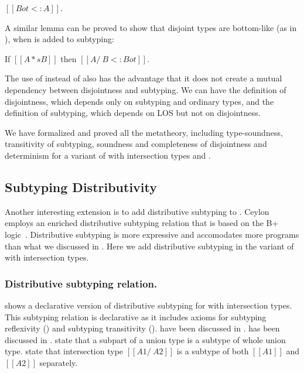 \begin{lemma}
  $[[Bot <: A]]$.
\label{lemma:discussion:bls}
\end{lemma}

\noindent A similar lemma can be proved to show that disjoint types are bottom-like
(as in ), when  is added to subtyping:

\begin{lemma}
  If $[[A *s B]]$ then $[[A /\ B <: Bot]]$.
\label{lemma:discussion:disjoint-types}
\end{lemma}

\noindent The use of  instead of  also has
the advantage that it does not create a mutual dependency between
disjointness and subtyping. We can have the definition of
disjointness, which depends only on subtyping and ordinary types, and
the definition of subtyping, which depends on LOS but not on
disjointness.

We have formalized and proved all the metatheory, including
type-soundness, transitivity of subtyping, soundness and completeness
of disjointness and determinism for a variant of \name with
intersection types and .

\subsection{Subtyping Distributivity}
\label{sec:inter:dist}

Another interesting extension is to add distributive subtyping to \cal.
Ceylon~\cite{muehlboeck2018empowering} employs an enriched 
distributive subtyping relation that is based on the B+ logic~\cite{?}.
Distributive subtyping is more expressive and accomodates more programs than what we discussed in
. Here we add distributive subtyping in the variant of \cal with
intersection types. 

\subsubsection*{Distributive subtyping relation.}
 shows a declarative version of distributive subtyping for
\cal with intersection types.
This subtyping relation is declarative as it includes axioms for subtyping reflexivity () and
subtyping transitivity ().  have been
discussed in .  has been discussed in .
 state that a subpart of a union type is a subtype of whole union type.
 state that intersection type $[[A1 /\ A2]]$ is a subtype of both $[[A1]]$
and $[[A2]]$ separately.

